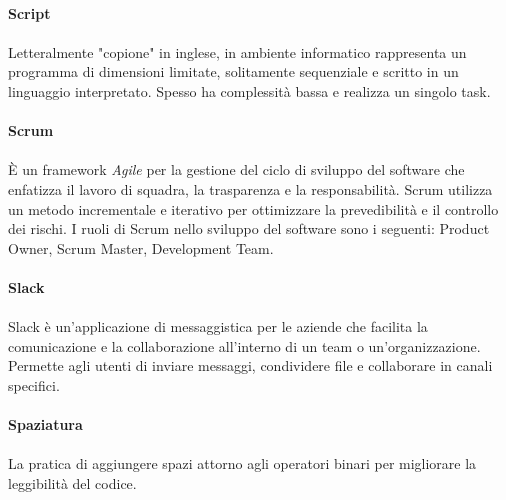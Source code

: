\documentclass[10pt, a4paper]{article}
\begin{document}
\vspace{2em}
\paragraph{Script}\noindent\hrulefill
\paragraph{}Letteralmente "copione" in inglese, in ambiente informatico rappresenta un programma di dimensioni limitate, solitamente sequenziale e scritto in un linguaggio interpretato. Spesso ha complessità bassa e realizza un singolo task.

\vspace{2em}
\paragraph{Scrum}\noindent\hrulefill
\paragraph{}È un framework  \textit{Agile\pg} per la gestione del ciclo di sviluppo del software che enfatizza il lavoro di squadra, la trasparenza e la responsabilità. Scrum utilizza un metodo incrementale e iterativo per ottimizzare la prevedibilità e il controllo dei rischi.
I ruoli di Scrum nello sviluppo del software sono i seguenti: Product Owner, Scrum Master, Development Team.


\vspace{2em}
\paragraph{Slack}\noindent\hrulefill
\paragraph{}Slack è un’applicazione di messaggistica per le aziende che facilita la comunicazione e la collaborazione all’interno di un team o un’organizzazione. Permette agli utenti di inviare messaggi, condividere file e collaborare in canali specifici. 

\vspace{2em}
\paragraph{Spaziatura}\noindent\hrulefill
\paragraph{}La pratica di aggiungere spazi attorno agli operatori binari per migliorare la leggibilità del codice.
\end{document}
